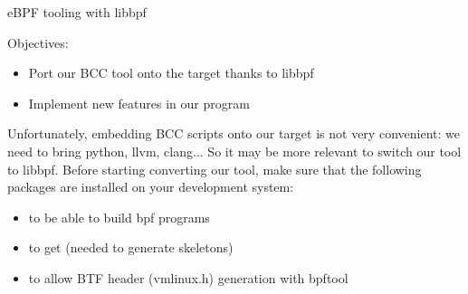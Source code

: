 \subchapter
{eBPF tooling with libbpf}
{Objectives:
  \begin{itemize}
    \item Port our BCC tool onto the target thanks to libbpf
    \item Implement new features in our program
  \end{itemize}
}

Unfortunately, embedding BCC scripts onto our target is not very convenient: we need to bring python, llvm, clang... So it may be more relevant to switch our tool to libbpf. Before starting converting our tool, make sure that the following packages are installed on your development system:
\begin{itemize}
  \item {} to be able to build bpf programs
  \item {} to get  (needed to generate skeletons)
  \item {} to allow BTF header (vmlinux.h) generation with bpftool
\end{itemize}

